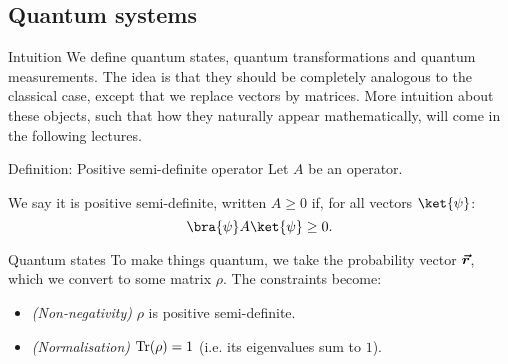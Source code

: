 \documentclass[a4paper]{article}
\begin{document}
\subsection{Quantum systems}

\begin{parag}{Intuition}
    We define quantum states, quantum transformations and quantum measurements. The idea is that they should be completely analogous to the classical case, except that we replace vectors by matrices. More intuition about these objects, such that how they naturally appear mathematically, will come in the following lectures.
\end{parag}

\begin{parag}{Definition: Positive semi-definite operator}
    Let $A$ be an operator.

    We say it is positive semi-definite, written $A \geq 0$ if, for all vectors $\ket{\psi}$: 
    \[\bra{\psi} A \ket{\psi} \geq 0.\]
\end{parag}

\begin{parag}{Quantum states}
    To make things quantum, we take the probability vector $\bm{\protect\vec{r}}$, which we convert to some matrix $\rho$. The constraints become:
    \begin{itemize}
        \item \textit{(Non-negativity)} $\rho$ is positive semi-definite.
        \item \textit{(Normalisation)} $\Tr\left(\rho\right) = 1$ (i.e. its eigenvalues sum to $1$). 
    \end{itemize}
\end{parag}
\end{document}
